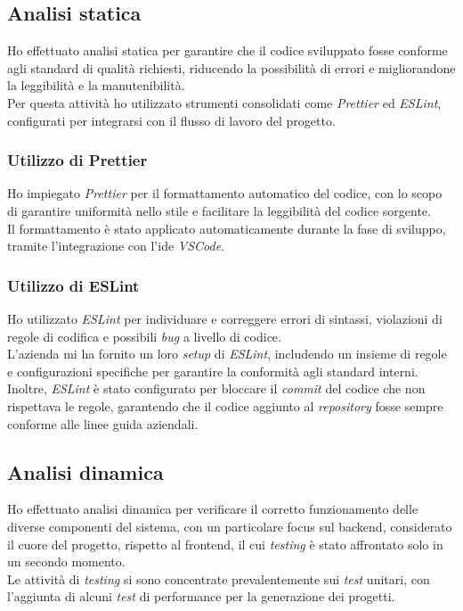 \subsection{Analisi statica}
\label{subsec:analisi-statica}

Ho effettuato analisi statica per garantire che il codice sviluppato fosse conforme agli standard di qualità richiesti, riducendo la possibilità di errori e migliorandone la leggibilità e la manutenibilità.\\
Per questa attività ho utilizzato strumenti consolidati come \textit{Prettier} ed \textit{ESLint}, configurati per integrarsi con il flusso di lavoro del progetto.\\

\subsubsection{Utilizzo di Prettier}  
Ho impiegato \textit{Prettier} per il formattamento automatico del codice, con lo scopo di garantire uniformità nello stile e facilitare la leggibilità del codice sorgente.\\
Il formattamento è stato applicato automaticamente durante la fase di sviluppo, tramite l'integrazione con l'\gls{ide} \textit{VSCode}.

\subsubsection{Utilizzo di ESLint}  
Ho utilizzato \textit{ESLint} per individuare e correggere errori di sintassi, violazioni di regole di codifica e possibili \textit{bug} a livello di codice. \\
L’azienda mi ha fornito un loro \textit{setup} di \textit{ESLint}, includendo un insieme di regole e configurazioni specifiche per garantire la conformità agli standard interni.\\
Inoltre, \textit{ESLint} è stato configurato per bloccare il \textit{commit} del codice che non rispettava le regole, garantendo che il codice aggiunto al \textit{repository} fosse sempre conforme alle linee guida aziendali.

\subsection{Analisi dinamica}
\label{subsec:analisi-dinamica}

Ho effettuato analisi dinamica per verificare il corretto funzionamento delle diverse componenti del sistema, con un particolare focus sul \gls{backend}, considerato il cuore del progetto, rispetto al \gls{frontend}, il cui \textit{testing} è stato affrontato solo in un secondo momento. \\
Le attività di \textit{testing} si sono concentrate prevalentemente sui \textit{test} unitari, con l'aggiunta di alcuni \textit{test} di performance per la generazione dei progetti.\\

